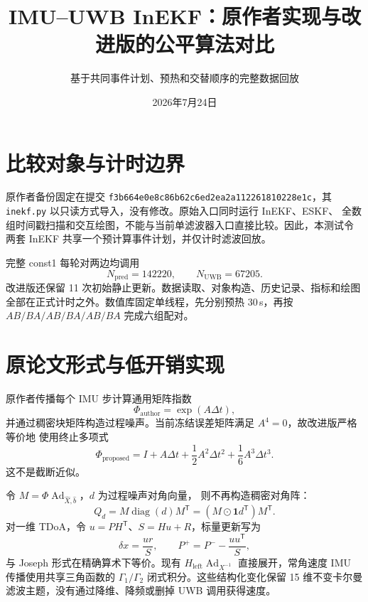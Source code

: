 \documentclass[11pt,a4paper]{ctexart}
\title{IMU--UWB InEKF：原作者实现与改进版的公平算法对比}
\author{基于共同事件计划、预热和交替顺序的完整数据回放}
\date{2026年7月24日}
\begin{document}
\maketitle

\section{比较对象与计时边界}

原作者备份固定在提交
\texttt{f3b664e0e8c86b62c6ed2ea2a112261810228e1c}，其
\texttt{inekf.py} 以只读方式导入，没有修改。原始入口同时运行 InEKF、ESKF、
全数组时间戳扫描和交互绘图，不能与当前单滤波器入口直接比较。因此，本测试令
两套 InEKF 共享一个预计算事件计划，并仅计时滤波回放。

完整 const1 每轮对两边均调用
\[
N_{\mathrm{pred}}=142220,\qquad N_{\mathrm{UWB}}=67205.
\]
改进版还保留 11 次初始静止更新。数据读取、对象构造、历史记录、指标和绘图
全部在正式计时之外。数值库固定单线程，先分别预热 30\,s，再按
$AB/BA/AB/BA/AB/BA$ 完成六组配对。

\section{原论文形式与低开销实现}

原作者传播每个 IMU 步计算通用矩阵指数
\begin{equation}
 \Phi_{\mathrm{author}}=\exp(A\Delta t),
\end{equation}
并通过稠密块矩阵构造过程噪声。当前冻结误差矩阵满足 $A^4=0$，故改进版严格等价地
使用终止多项式
\begin{equation}
 \boxed{\Phi_{\mathrm{proposed}}
 =I+A\Delta t+\frac{1}{2}A^2\Delta t^2
 +\frac{1}{6}A^3\Delta t^3.}
\end{equation}
这不是截断近似。

令 $M=\Phi\operatorname{Ad}_{\hat X,\hat b}$，$d$ 为过程噪声对角向量，
则不再构造稠密对角阵：
\begin{equation}
 Q_d=M\operatorname{diag}(d)M^\mathsf{T}
 =\left(M\odot\bm{1}d^\mathsf{T}\right)M^\mathsf{T}.
\end{equation}
对一维 TDoA，令 $u=PH^\mathsf{T}$、$S=Hu+R$，标量更新写为
\begin{equation}
 \delta x=\frac{u r}{S},\qquad
 \boxed{P^+=P^--\frac{uu^\mathsf{T}}{S}},
\end{equation}
与 Joseph 形式在精确算术下等价。现有
$H_{\mathrm{left}}\operatorname{Ad}_{X^{-1}}$ 直接展开，常角速度 IMU
传播使用共享三角函数的 $\Gamma_1/\Gamma_2$ 闭式积分。这些结构化变化保留
15 维不变卡尔曼滤波主题，没有通过降维、降频或删掉 UWB 调用获得速度。
\end{document}
